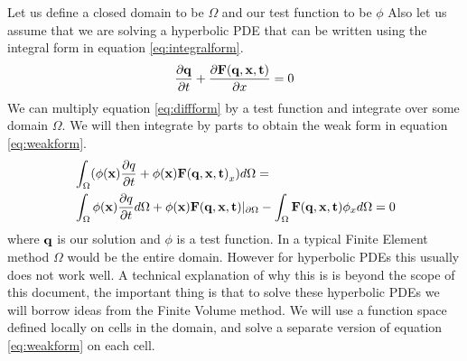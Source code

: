 \documentclass[10]{amsart}
\begin{document}
Let us define a closed domain to be $\Omega$ and our test function to be $\phi$   
Also let us assume that we are solving a hyperbolic PDE that can be written using the integral form in equation
\eqref{eq:integralform}.
\begin{equation}
 \frac{\partial {\bf q}}{\partial t} + \frac{\partial {\bf F(q,x,t)}}{\partial x}=0
 \label{eq:diffform}
\end{equation}
We can multiply equation \ref{eq:diffform} by a test function and integrate over some domain $\Omega$. 
We will then integrate by parts to obtain the weak
form in equation \eqref{eq:weakform}.
\begin{align}
 &\int_{\Omega} (\phi({\bf x}) \frac{\partial q}{\partial t} + \phi({\bf x})  {\bf F(q,x,t)}_x) d\Omega
=\nonumber \\ 
&\int_{\Omega} \phi({\bf x}) \frac{\partial q}{\partial t} d\Omega +  \phi({\bf x}) {\bf F(q,x,t)} |_{\partial \Omega}
 -\int_{\Omega}{\bf F(q,x,t)} \phi_x d\Omega =0 \label{eq:weakform}
 \end{align}
 where ${\bf q}$ is our solution and $\phi$ is a test function. 
 In a typical Finite Element method $\Omega$ would be the entire domain. However for hyperbolic PDEs this usually
 does not work well. A technical explanation of why this is is beyond the scope of this document, the important thing
 is that to solve these hyperbolic PDEs we will borrow ideas from the Finite Volume method. We will use
 a function space defined locally on cells in the domain, and solve a separate version of equation \eqref{eq:weakform} 
 on each cell.
\end{document}
